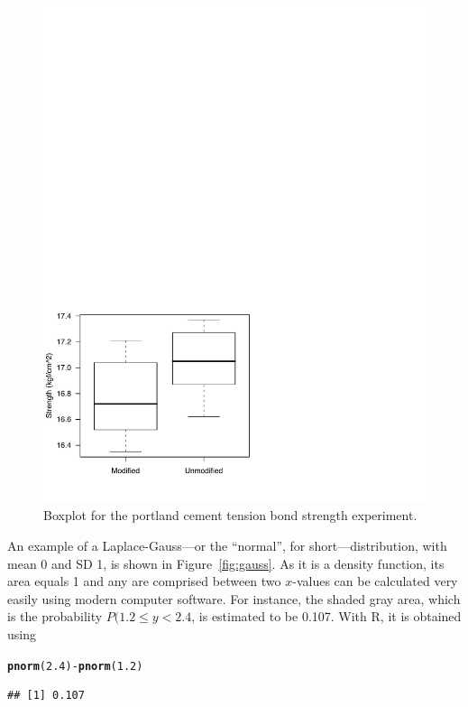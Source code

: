 \documentclass[11pt,a4paper]{memoir}\usepackage[]{graphicx}\usepackage[]{color}
\makeatletter
\newcommand{\hlnum}[1]{\textcolor[rgb]{0.686,0.059,0.569}{#1}}%
\newcommand{\hlopt}[1]{\textcolor[rgb]{0,0,0}{#1}}%
\newcommand{\hlstd}[1]{\textcolor[rgb]{0.345,0.345,0.345}{#1}}%
\newcommand{\hlkwd}[1]{\textcolor[rgb]{0.737,0.353,0.396}{\textbf{#1}}}%
\newenvironment{kframe}{%
 \def\at@end@of@kframe{}%
 \ifinner\ifhmode%
  \def\at@end@of@kframe{\end{minipage}}%
  \begin{minipage}{\columnwidth}%
 \fi\fi%
 \def\FrameCommand##1{\hskip\@totalleftmargin \hskip-\fboxsep
 \colorbox{shadecolor}{##1}\hskip-\fboxsep
     \hskip-\linewidth \hskip-\@totalleftmargin \hskip\columnwidth}%
 \MakeFramed {\advance\hsize-\width
   \@totalleftmargin\z@ \linewidth\hsize
   \@setminipage}}%
 {\par\unskip\endMakeFramed%
 \at@end@of@kframe}
\newenvironment{knitrout}{}{} %
\newcommand{\R}{\textsf{R}}
\makeatother
\begin{document}
\begin{figure}[ht]
\centering
  \includegraphics[width=.5\textwidth]{./inputs/fig3.pdf}
  \caption{Boxplot for the portland cement tension bond strength
    experiment.}\label{fig:2.3}
\end{figure}

An example of a Laplace-Gauss---or the ``normal'', for
short---distribution, with mean 0 and SD 1, is shown in
Figure~\ref{fig:gauss}. As it is a density function, its area equals 1
and any are comprised between two $x$-values can be calculated very
easily using modern computer software. For instance, the shaded gray
area, which is the probability $P(1.2\leq y<2.4$, is estimated to be
0.107. With \R, it is obtained using 

\begin{knitrout}
\color{fgcolor}\begin{kframe}
\begin{alltt}
\hlkwd{pnorm}\hlstd{(}\hlnum{2.4}\hlstd{)} \hlopt{-} \hlkwd{pnorm}\hlstd{(}\hlnum{1.2}\hlstd{)}
\end{alltt}
\begin{verbatim}
## [1] 0.107
\end{verbatim}
\end{kframe}
\end{knitrout}
\end{document}
